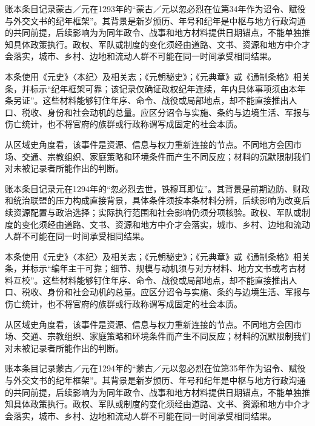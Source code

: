 账本条目记录蒙古／元在1293年的“蒙古／元以忽必烈在位第34年作为诏令、赋役与外交文书的纪年框架”。其背景是新岁颁历、年号和纪年是中枢与地方行政沟通的共同前提，后续影响为为同年政令、战事和地方材料提供日期锚点，不能单独推知具体政策执行。政权、军队或制度的变化须经由道路、文书、资源和地方中介才会落实，城市、乡村、边地和流动人群不可能在同一时间承受相同结果。

本条使用《元史》〈本纪〉及相关志；《元朝秘史》；《元典章》或《通制条格》相关条，并标示“纪年框架可靠；该记录仅确证政权纪年连续，年内具体事项须由本年条另证”。这些材料能够钉住年序、命令、战役或局部地点，却不能直接推出人口、税收、身份和社会动机的总量。应区分诏令与实施、条约与边境生活、军报与伤亡统计，也不将官府的族群或行政称谓写成固定的社会本质。

从区域史角度看，该事件是资源、信息与权力重新连接的节点。不同地方会因市场、交通、宗教组织、家庭策略和环境条件而产生不同反应；材料的沉默限制我们对未被记录者所能作出的判断。

账本条目记录元在1294年的“忽必烈去世，铁穆耳即位”。其背景是前期边防、财政和统治联盟的压力构成直接背景，具体条件须按本条材料分辨，后续影响为改变后续资源配置与政治选择；实际执行范围和社会影响仍须分项核验。政权、军队或制度的变化须经由道路、文书、资源和地方中介才会落实，城市、乡村、边地和流动人群不可能在同一时间承受相同结果。

本条使用《元史》〈本纪〉及相关志；《元朝秘史》；《元典章》或《通制条格》相关条，并标示“编年主干可靠；细节、规模与动机须与对方材料、地方文书或考古材料互校”。这些材料能够钉住年序、命令、战役或局部地点，却不能直接推出人口、税收、身份和社会动机的总量。应区分诏令与实施、条约与边境生活、军报与伤亡统计，也不将官府的族群或行政称谓写成固定的社会本质。

从区域史角度看，该事件是资源、信息与权力重新连接的节点。不同地方会因市场、交通、宗教组织、家庭策略和环境条件而产生不同反应；材料的沉默限制我们对未被记录者所能作出的判断。

账本条目记录蒙古／元在1294年的“蒙古／元以忽必烈在位第35年作为诏令、赋役与外交文书的纪年框架”。其背景是新岁颁历、年号和纪年是中枢与地方行政沟通的共同前提，后续影响为为同年政令、战事和地方材料提供日期锚点，不能单独推知具体政策执行。政权、军队或制度的变化须经由道路、文书、资源和地方中介才会落实，城市、乡村、边地和流动人群不可能在同一时间承受相同结果。

